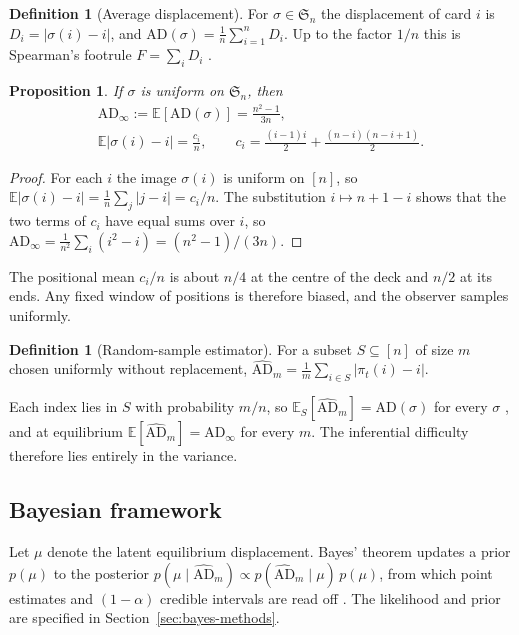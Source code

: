 \documentclass[ba,preprint]{imsart}
\theoremstyle{plain}
\newtheorem{proposition}[theorem]{Proposition}
\theoremstyle{definition}
\newtheorem{definition}[theorem]{Definition}
\newcommand{\E}{\mathbb{E}}
\newcommand{\AD}{\mathrm{AD}}
\newcommand{\ADh}{\widehat{\mathrm{AD}}}
\newcommand{\Sym}{\mathfrak{S}}
\begin{document}
\begin{definition}[Average displacement]\label{def:ad}
For $\sigma\in\Sym_n$ the displacement of card $i$ is $D_i=|\sigma(i)-i|$, and $\AD(\sigma)=\frac1n\sum_{i=1}^n D_i$. Up to the factor $1/n$ this is Spearman's footrule $F=\sum_i D_i$ \citep{DiaconisGraham1977}.
\end{definition}

\begin{proposition}\label{prop:mean}
If $\sigma$ is uniform on $\Sym_n$, then
\begin{equation}\label{eq:mean}
\begin{gathered}
\AD_\infty:=\E[\AD(\sigma)]=\frac{n^2-1}{3n},\\
\E|\sigma(i)-i|=\frac{c_i}{n},\qquad
c_i=\frac{(i-1)i}{2}+\frac{(n-i)(n-i+1)}{2}.
\end{gathered}
\end{equation}
\end{proposition}

\begin{proof}
For each $i$ the image $\sigma(i)$ is uniform on $[n]$, so $\E|\sigma(i)-i|=\frac1n\sum_j|j-i|=c_i/n$. The substitution $i\mapsto n+1-i$ shows that the two terms of $c_i$ have equal sums over $i$, so $\AD_\infty=\frac{1}{n^2}\sum_i(i^2-i)=(n^2-1)/(3n)$.
\end{proof}

The positional mean $c_i/n$ is about $n/4$ at the centre of the deck and $n/2$ at its ends. Any fixed window of positions is therefore biased, and the observer samples uniformly.

\begin{definition}[Random-sample estimator]\label{def:estimator}
For a subset $S\subseteq[n]$ of size $m$ chosen uniformly without replacement, $\ADh_m=\frac1m\sum_{i\in S}|\pi_t(i)-i|$.
\end{definition}

Each index lies in $S$ with probability $m/n$, so $\E_S[\ADh_m]=\AD(\sigma)$ for every $\sigma$ \citep{Cochran1977}, and at equilibrium $\E[\ADh_m]=\AD_\infty$ for every $m$. The inferential difficulty therefore lies entirely in the variance.

\subsection{Bayesian framework}

Let $\mu$ denote the latent equilibrium displacement. Bayes' theorem updates a prior $p(\mu)$ to the posterior $p(\mu\mid\ADh_m)\propto p(\ADh_m\mid\mu)\,p(\mu)$, from which point estimates and $(1-\alpha)$ credible intervals are read off \citep{Bishop2006,Robert2007}. The likelihood and prior are specified in Section~\ref{sec:bayes-methods}.
\end{document}
